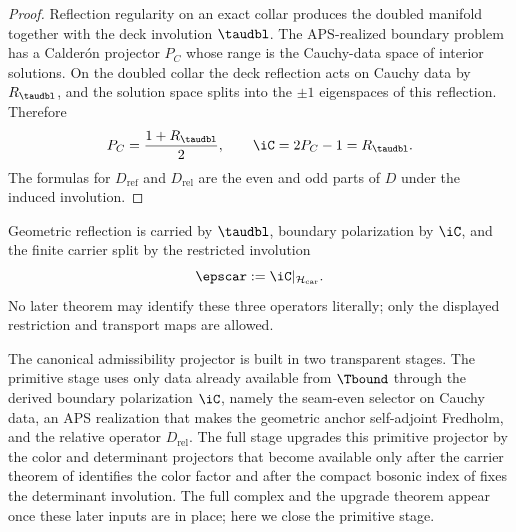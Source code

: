 \begin{proof}
Reflection regularity on an exact collar produces the doubled manifold together with the deck
involution $\taudbl$. The APS-realized boundary problem has a Calder\'on projector $P_C$ whose
range is the Cauchy-data space of interior solutions. On the doubled collar the deck reflection
acts on Cauchy data by $R_{\taudbl}$, and the solution space splits into the $\pm1$ eigenspaces of
this reflection. Therefore
\[
P_C=\frac{1+R_{\taudbl}}{2},
\qquad
\iC=2P_C-1=R_{\taudbl}.
\]
The formulas for $D_{\mathrm{ref}}$ and $D_{\mathrm{rel}}$ are the even and odd parts of $D$ under
the induced involution.
\end{proof}

\begin{corollary}
Geometric reflection is carried by $\taudbl$, boundary polarization by $\iC$, and the finite
carrier split by the restricted involution
\[
\epscar:=\iC|_{\mathcal H_{\mathrm{car}}}.
\]
No later theorem may identify these three operators literally; only the displayed restriction and
transport maps are allowed.
\end{corollary}

The canonical admissibility projector is built in two transparent stages. The primitive stage
uses only data already available from $\Tbound$ through the derived boundary polarization $\iC$,
namely the seam-even selector on Cauchy data, an APS realization that makes the geometric anchor
self-adjoint Fredholm, and the relative operator $D_{\mathrm{rel}}$. The full stage upgrades this
primitive projector by the color and determinant projectors that become available only after the
carrier theorem of  identifies the color factor and after the
compact bosonic index of  fixes the determinant involution. The full
complex and the upgrade theorem appear once these later inputs are in place; here we close the
primitive stage.

